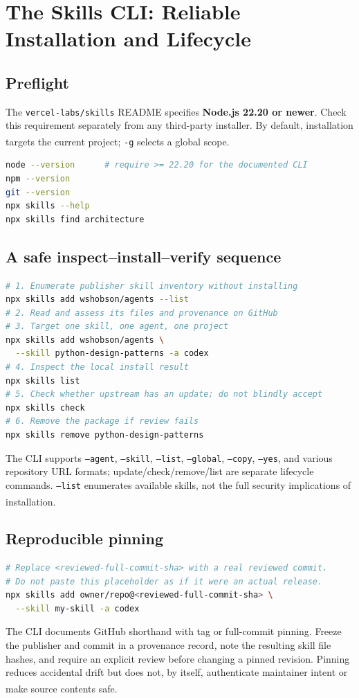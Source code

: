 \documentclass[11pt,letterpaper]{article}
\newcommand{\src}[1]{\textsuperscript{\textcolor{teal}{\cite{#1}}}}
\newcommand{\repo}[1]{\texttt{#1}}
\begin{document}
\section{The Skills CLI: Reliable Installation and Lifecycle}
\subsection{Preflight}
The \repo{vercel-labs/skills} README specifies \textbf{Node.js 22.20 or newer}. Check this requirement separately from any third-party installer. By default, installation targets the current project; \texttt{-g} selects a global scope.\src{vercelcli,vercelcommands}
\begin{lstlisting}[language=bash]
node --version      # require >= 22.20 for the documented CLI
npm --version
git --version
npx skills --help
npx skills find architecture
\end{lstlisting}
\subsection{A safe inspect--install--verify sequence}
\begin{lstlisting}[language=bash]
# 1. Enumerate publisher skill inventory without installing
npx skills add wshobson/agents --list
# 2. Read and assess its files and provenance on GitHub
# 3. Target one skill, one agent, one project
npx skills add wshobson/agents \
  --skill python-design-patterns -a codex
# 4. Inspect the local install result
npx skills list
# 5. Check whether upstream has an update; do not blindly accept
npx skills check
# 6. Remove the package if review fails
npx skills remove python-design-patterns
\end{lstlisting}
The CLI supports \texttt{--agent}, \texttt{--skill}, \texttt{--list}, \texttt{--global}, \texttt{--copy}, \texttt{--yes}, and various repository URL formats; update/check/remove/list are separate lifecycle commands. \texttt{--list} enumerates available skills, not the full security implications of installation.\src{vercelcommands}

\subsection{Reproducible pinning}
\begin{lstlisting}[language=bash]
# Replace <reviewed-full-commit-sha> with a real reviewed commit.
# Do not paste this placeholder as if it were an actual release.
npx skills add owner/repo@<reviewed-full-commit-sha> \
  --skill my-skill -a codex
\end{lstlisting}
The CLI documents GitHub shorthand with tag or full-commit pinning. Freeze the publisher and commit in a provenance record, note the resulting skill file hashes, and require an explicit review before changing a pinned revision. Pinning reduces accidental drift but does not, by itself, authenticate maintainer intent or make source contents safe.\src{vercelcommands}
\end{document}
